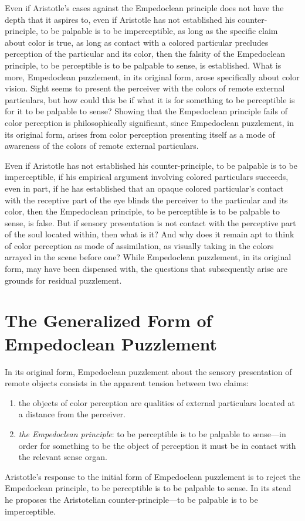 Even if Aristotle's cases against the Empedoclean principle does not have the depth that it aspires to, even if Aristotle has not established his counter-principle, to be palpable is to be imperceptible, as long as the specific claim about color is true, as long as contact with a colored particular precludes perception of the particular and its color, then the falsity of the Empedoclean principle, to be perceptible is to be palpable to sense, is established. What is more, Empedoclean puzzlement, in its original form, arose specifically about color vision. Sight seems to present the perceiver with the colors of remote external particulars, but how could this be if what it is for something to be perceptible is for it to be palpable to sense? Showing that the Empedoclean principle fails of color perception is philosophically significant, since Empedoclean puzzlement, in its original form, arises from color perception presenting itself as a mode of awareness of the colors of remote external particulars. 

Even if Aristotle has not established his counter-principle, to be palpable is to be imperceptible, if his empirical argument involving colored particulars succeeds, even in part, if he has established that an opaque colored particular's contact with the receptive part of the eye blinds the perceiver to the particular and its color, then the Empedoclean principle, to be perceptible is to be palpable to sense, is false. But if sensory presentation is not contact with the perceptive part of the soul located within, then what is it? And why does it remain apt to think of color perception as mode of assimilation, as visually taking in the colors arrayed in the scene before one? While Empedoclean puzzlement, in its original form, may have been dispensed with, the questions that subsequently arise are grounds for residual puzzlement.


\section{The Generalized Form of Empedoclean Puzzlement} %
\label{sec:the_generalized_form_of_empedoclean_puzzlement}

In its original form, Empedoclean puzzlement about the sensory presentation of remote objects consists in the apparent tension between two claims:
\begin{enumerate}[(1)]
    \item the objects of color perception are qualities of external particulars located at a distance from the perceiver.
    \item \emph{the Empedoclean principle}: to be perceptible is to be palpable to sense---in order for something to be the object of perception it must be in contact with the relevant sense organ.
\end{enumerate}
Aristotle's response to the initial form of Empedoclean puzzlement is to reject the Empedoclean principle, to be perceptible is to be palpable to sense. In its stead he proposes the Aristotelian counter-principle---to be palpable is to be imperceptible. 

